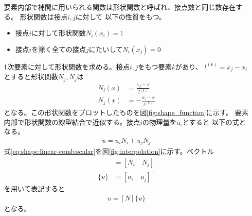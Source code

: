 \documentclass[paper=a4]{jlreq}
\begin{document}
要素内部で補間に用いられる関数は形状関数と呼ばれ、接点数と同じ数存在する。
形状関数は接点$i,j$に対して
以下の性質をもつ。
\begin{itemize}
    \item 接点$i$に対して形状関数$N_i(x_i) = 1$
    \item 接点$i$を除く全ての接点$j$にたいして$N_i(x_j) = 0$
\end{itemize}
1次要素に対して形状関数を求める。接点$i,j$をもつ要素$k$があり、
$l^{(k)} = x_j-x_i$とすると形状関数$N_j,N_j$は
\begin{align}
    N_i(x)  &= \frac{x_j -x}{l^{(k)}} \label{eq:shape:i}\\
    N_j(x)  &= -\frac{x_i -x}{l^{(k)}} \label{eq:shape:j}
\end{align}
となる。この形状関数をプロットしたものを図\ref{fig:shape_function}に示す。
要素内部で形状関数の線型結合で近似する。接点$i$の物理量を$u_i$とすると
以下の式となる。
\begin{align}
    u = u_iN_i+u_jN_j \label{eq:shape:linear-comb:scalar}
\end{align}
式\eqref{eq:shape:linear-comb:scalar}を図\ref{fig:interpolation}に示す。ベクトル
\begin{align}
    [N] &= [N_i \quad N_j] \label{eq:shape:mat}\\
    \{u\} &= [u_i \quad u_j]^\intercal \label{eq:value:mat}
\end{align}
を用いて表記すると
\begin{align}
    u = [N]\{u\} \label{eq:shape:linear-comb}
\end{align}
となる。
\end{document}
